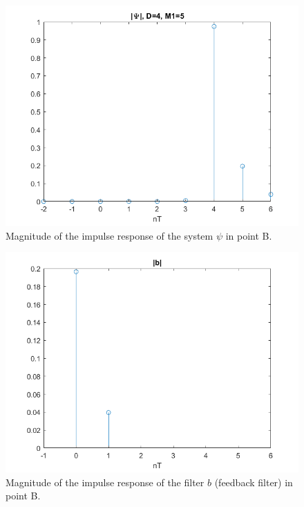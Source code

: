 \documentclass[a4paper,11.5pt]{article}
\begin{document}
\begin{figure}[ht]
	\begin{center}   
		\includegraphics[width=\textwidth]{figs/B_psi.png} 
		\caption{Magnitude of the impulse response of the system $\psi$ in point B.}
		\label{fig:B_psi}
	\end{center}
\end{figure}

\begin{figure}[ht]
	\begin{center}   
		\includegraphics[width=\textwidth]{figs/B_b.png} 
		\caption{Magnitude of the impulse response of the filter $b$ (feedback filter) in point B.}
		\label{fig:B_b}
	\end{center}
\end{figure}
\end{document}
